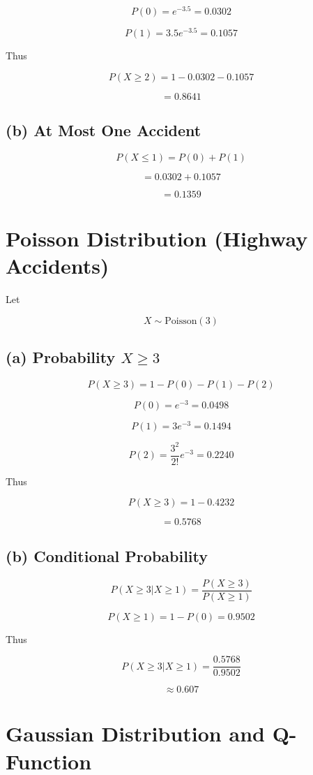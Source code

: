 \documentclass[12pt]{article}
\begin{document}
\[
P(0)=e^{-3.5}=0.0302
\]

\[
P(1)=3.5e^{-3.5}=0.1057
\]

Thus

\[
P(X\ge2)=1-0.0302-0.1057
\]

\[
=0.8641
\]

\subsection*{(b) At Most One Accident}

\[
P(X\le1)=P(0)+P(1)
\]

\[
=0.0302+0.1057
\]

\[
=0.1359
\]

\section{Poisson Distribution (Highway Accidents)}

Let

\[
X\sim \text{Poisson}(3)
\]

\subsection*{(a) Probability $X\ge3$}

\[
P(X\ge3)=1-P(0)-P(1)-P(2)
\]

\[
P(0)=e^{-3}=0.0498
\]

\[
P(1)=3e^{-3}=0.1494
\]

\[
P(2)=\frac{3^2}{2!}e^{-3}=0.2240
\]

Thus

\[
P(X\ge3)=1-0.4232
\]

\[
=0.5768
\]

\subsection*{(b) Conditional Probability}

\[
P(X\ge3|X\ge1)=\frac{P(X\ge3)}{P(X\ge1)}
\]

\[
P(X\ge1)=1-P(0)=0.9502
\]

Thus

\[
P(X\ge3|X\ge1)=\frac{0.5768}{0.9502}
\]

\[
\approx0.607
\]

\section{Gaussian Distribution and Q-Function}
\end{document}
